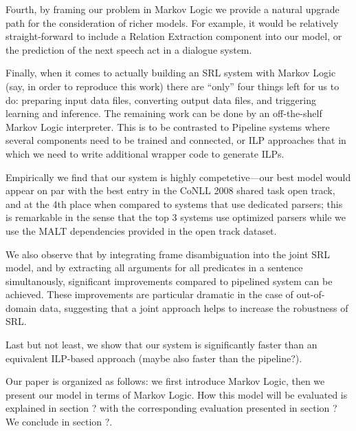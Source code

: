 Fourth, by framing our problem in Markov Logic we provide a natural
upgrade path for the consideration of richer models. For example, it
would be relatively straight-forward to include a Relation Extraction
component into our model, or the prediction of the next speech act in a
dialogue system.

Finally, when it comes to actually building an SRL system with Markov
Logic (say, in order to reproduce this work) there are ``only''
four things left for us to do: preparing input data files, converting
output data files, and triggering learning and inference. The remaining
work can be done by an off-the-shelf Markov Logic interpreter. This
is to be contrasted to Pipeline systems where several components need
to be trained and connected, or ILP approaches that in which we need
to write additional wrapper code to generate ILPs.

Empirically we find that our system is highly competetive---our best
model would appear on par with the best entry in the CoNLL 2008
shared task open track, and at the 4th place when compared to systems
that use dedicated parsers; this is remarkable in the sense that the
top 3 systems use optimized parsers while we use the MALT
dependencies provided in the open track dataset.  


We also observe that by integrating frame disambiguation into the
joint SRL model, and by extracting all arguments for all predicates in a
sentence simultanously, significant improvements compared to pipelined
system can be achieved. These improvements are particular dramatic in
the case of out-of-domain data, suggesting that a joint approach helps
to increase the robustness of SRL. 

Last but not least, we show that our system is significantly faster
than an equivalent ILP-based approach (maybe also faster than the
pipeline?). 

Our paper is organized as follows: we first introduce Markov Logic,
then we present our model in terms of Markov Logic. How this model
will be evaluated is explained in section ? with the corresponding
evaluation presented in section ? We conclude in section ?.


